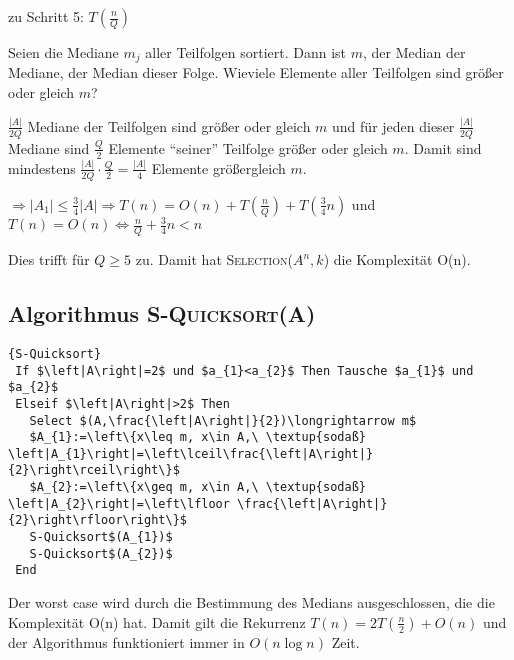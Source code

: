 zu Schritt 5: $T(\frac{n}{Q})$
 \bigskip
 
Seien die Mediane $m_{j}$ aller Teilfolgen sortiert. Dann ist $m$, der Median der Mediane, der Median dieser Folge. 
Wieviele Elemente aller Teilfolgen sind größer oder gleich $m$?

 $\frac{\left|A\right|}{2Q}$ Mediane der Teilfolgen sind größer oder gleich $m$ und für jeden dieser $\frac{\left|A\right|}{2Q}$
 Mediane sind $\frac{Q}{2}$ Elemente "`seiner"' Teilfolge größer oder gleich $m$. Damit sind mindestens
 $\frac{\left|A\right|}{2Q}\cdot \frac{Q}{2}=\frac{\left|A\right|}{4}$ Elemente größergleich $m$.
	
 $\Rightarrow\left|A_{1}\right|\leq\frac{3}{4}\left|A\right|\Rightarrow T(n)=O(n)+T(\frac{n}{Q})+T(\frac{3}{4}n)$
und $T(n)=O(n)\Longleftrightarrow\frac{n}{Q}+\frac{3}{4}n<n$

 Dies trifft für $Q\geq 5$ zu. Damit hat \textsc{Selection}($A^n,k$) die Komplexität O(n).

 \subsection{Algorithmus \textsc{S-Quicksort(A)}}

\begin{Algorithmus}[ht]
\begin{lstlisting}[frame=tlrb, mathescape=true, title=\textsc{S-Quicksort}, gobble=1]{S-Quicksort}
 If $\left|A\right|=2$ und $a_{1}<a_{2}$ Then Tausche $a_{1}$ und $a_{2}$
 Elseif $\left|A\right|>2$ Then
   Select $(A,\frac{\left|A\right|}{2})\longrightarrow m$
   $A_{1}:=\left\{x\leq m, x\in A,\ \textup{sodaß} \left|A_{1}\right|=\left\lceil\frac{\left|A\right|}{2}\right\rceil\right\}$
   $A_{2}:=\left\{x\geq m, x\in A,\ \textup{sodaß} \left|A_{2}\right|=\left\lfloor \frac{\left|A\right|}{2}\right\rfloor\right\}$
   S-Quicksort$(A_{1})$
   S-Quicksort$(A_{2})$
 End
 \end{lstlisting}
  \end{Algorithmus}

Der worst case wird durch die Bestimmung des Medians ausgeschlossen, die die Komplexität O(n) hat. Damit gilt die Rekurrenz
$T(n)=2T(\frac{n}{2})+O(n)$ und der Algorithmus funktioniert immer in $O(n \log n)$ Zeit.
 
